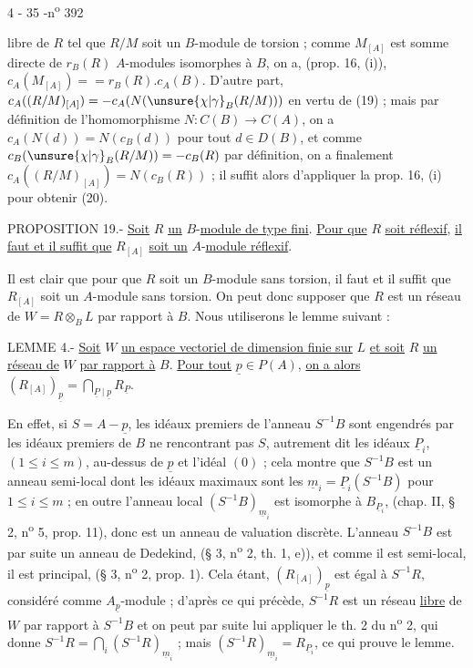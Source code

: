 \begin{center}4 - 35 -\hfill n\textsuperscript{o} 392\end{center}

libre de $R$ tel que $R/M$ soit un $B$-module de torsion ; comme $M_{[A]}$ est somme directe de $r_B(R)$ $A$-modules isomorphes à $B$, on a, (prop. 16, (i)), $c_A(M_{[A]})= {}=r_B(R).c_A(B)$. D'autre part, $c_A((R/M)_{[A]})=-c_A(N(\unsure{\chi|\gamma}_B(R/M)))$ en vertu de (19) ; mais par définition de l'homomorphisme $N:C(B)\longrightarrow C(A)$, on a $c_A(N(d))=N(c_B(d))$ pour tout $d\in D(B)$, et comme $c_B(\unsure{\chi|\gamma}_B(R/M))=-c_B(R)$ par définition, on a finalement $c_A((R/M)_{[A]})=N(c_B(R))$ ; il suffit alors d'appliquer la prop. 16, (i) pour obtenir (20).

PROPOSITION 19.- \uline{Soit} $R$ \uline{un} $B$-\uline{module de type fini}. \uline{Pour que} $R$ \uline{soit réflexif}, \uline{il faut et il suffit que} $R_{[A]}$ \uline{soit un} $A$-\uline{module réflexif}.

Il est clair que pour que $R$ soit un $B$-module sans torsion, il faut et il suffit que $R_{[A]}$ soit un $A$-module sans torsion. On peut donc supposer que $R$ est un réseau de $W=R\otimes_B L$ par rapport à $B$. Nous utiliserons le lemme suivant :

LEMME 4.- \uline{Soit} $W$ \uline{un espace vectoriel de dimension finie sur} $L$ \uline{et soit} $R$ \uline{un réseau de} $W$ \uline{par rapport à} $B$. \uline{Pour tout} $\underline{p}\in P(A)$, \uline{on a alors} $(R_{[A]})_{\underline{p}}=\bigcap_{\underline{P}\mid\underline{p}}R_{\underline{P}}$.

En effet, si $S=A-\underline{p}$, les idéaux premiers de l'anneau $S^{-1}B$ sont engendrés par les idéaux premiers de $B$ ne rencontrant pas $S$, autrement dit les idéaux $\underline{P}_i$, $(1\le i\le m)$, au-dessus de $\underline{p}$ et l'idéal $(0)$ ; cela montre que $S^{-1}B$ est un anneau semi-local dont les idéaux maximaux sont les $\underline{m}_i=\underline{P}_i(S^{-1}B)$ pour $1\le i\le m$ ; en outre l'anneau local $(S^{-1}B)_{\underline{m}_i}$ est isomorphe à $B_{\underline{P}_i}$, (chap. II, § 2, n\textsuperscript{o} 5, prop. 11), donc est un anneau de valuation discrète. L'anneau $S^{-1}B$ est par suite un anneau de Dedekind, (§ 3, n\textsuperscript{o} 2, th. 1, e)), et comme il est semi-local, il est principal, (§ 3, n\textsuperscript{o} 2, prop. 1). Cela étant, $(R_{[A]})_{\underline{p}}$ est égal à $S^{-1}R$, considéré comme $A_{\underline{p}}$-module ; d'après ce qui précède, $S^{-1}R$ est un réseau \uline{libre} de $W$ par rapport à $S^{-1}B$ et on peut par suite lui appliquer le th. 2 du n\textsuperscript{o} 2, qui donne $S^{-1}R=\bigcap_i(S^{-1}R)_{\underline{m}_i}$ ; mais $(S^{-1}R)_{\underline{m}_i}=R_{\underline{P}_i}$, ce qui prouve le lemme.

